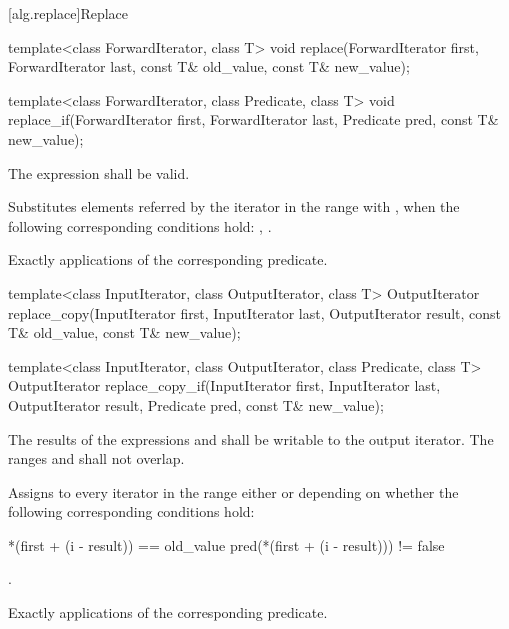 [alg.replace]{Replace}

%
%
\begin{itemdecl}
template<class ForwardIterator, class T>
  void replace(ForwardIterator first, ForwardIterator last,
               const T& old_value, const T& new_value);

template<class ForwardIterator, class Predicate, class T>
  void replace_if(ForwardIterator first, ForwardIterator last,
                  Predicate pred, const T& new_value);
\end{itemdecl}

\begin{itemdescr}
\pnum
\requires
The expression
shall be valid.

\pnum
\effects
Substitutes elements referred by the iterator
in the range 
with ,
when the following corresponding conditions hold:
, .

\pnum
\complexity
Exactly
applications of the corresponding predicate.
\end{itemdescr}

%
%
\begin{itemdecl}
template<class InputIterator, class OutputIterator, class T>
  OutputIterator
    replace_copy(InputIterator first, InputIterator last,
                 OutputIterator result,
                 const T& old_value, const T& new_value);

template<class InputIterator, class OutputIterator, class Predicate, class T>
  OutputIterator
    replace_copy_if(InputIterator first, InputIterator last,
                    OutputIterator result,
                    Predicate pred, const T& new_value);
\end{itemdecl}

\begin{itemdescr}
\pnum
\requires
The results of the expressions
and
shall be writable to the
output iterator.
The ranges
and
shall not overlap.

\pnum
\effects
Assigns to every iterator
in the
range
either
or
depending on whether the following corresponding conditions hold:

\begin{codeblock}
*(first + (i - result)) == old_value
pred(*(first + (i - result))) != false
\end{codeblock}

\pnum
\returns
{}.

\pnum
\complexity
Exactly
applications of the corresponding predicate.
\end{itemdescr}


